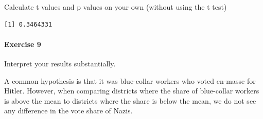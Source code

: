 \documentclass[]{article}
\newenvironment{Shaded}{\begin{snugshade}}{\end{snugshade}}
\newcommand{\KeywordTok}[1]{\textcolor[rgb]{0.13,0.29,0.53}{\textbf{#1}}}
\newcommand{\DecValTok}[1]{\textcolor[rgb]{0.00,0.00,0.81}{#1}}
\newcommand{\StringTok}[1]{\textcolor[rgb]{0.31,0.60,0.02}{#1}}
\newcommand{\CommentTok}[1]{\textcolor[rgb]{0.56,0.35,0.01}{\textit{#1}}}
\newcommand{\OperatorTok}[1]{\textcolor[rgb]{0.81,0.36,0.00}{\textbf{#1}}}
\newcommand{\NormalTok}[1]{#1}
\let\oldparagraph\paragraph
\renewcommand{\paragraph}[1]{\oldparagraph{#1}\mbox{}}
\theoremstyle{definition}
\theoremstyle{definition}
\theoremstyle{definition}
\theoremstyle{remark}
\begin{document}
Calculate t values and p values on your own (without using the t test)

\begin{Shaded}
\end{Shaded}

\begin{verbatim}
[1] 0.3464331
\end{verbatim}

\paragraph{Exercise 9}\label{exercise-9-3}

Interpret your results substantially.

A common hypothesis is that it was blue-collar workers who voted
en-masse for Hitler. However, when comparing districts where the share
of blue-collar workers is above the mean to districts where the share is
below the mean, we do not see any difference in the vote share of Nazis.
\end{document}
